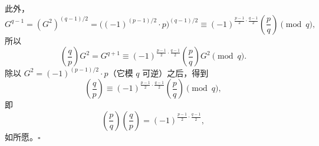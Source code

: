 此外，
\[
G^{q-1}=(G^2)^{(q-1)/2}=\bigl((-1)^{(p-1)/2}\cdot p\bigr)^{(q-1)/2}\equiv (-1)^{\frac{p-1}{2}\cdot\frac{q-1}{2}}\left(\frac{p}{q}\right)\pmod q,
\]
所以
\[
\left(\frac{q}{p}\right)G^2=G^{q+1}\equiv (-1)^{\frac{p-1}{2}\cdot\frac{q-1}{2}}\left(\frac{p}{q}\right)G^2 \pmod q .
\]
除以 $G^2=(-1)^{(p-1)/2}\cdot p$（它模 $q$ 可逆）之后，得到
\[
\left(\frac{q}{p}\right)\equiv (-1)^{\frac{p-1}{2}\cdot\frac{q-1}{2}}\left(\frac{p}{q}\right)\pmod q,
\]
即
\[
\left(\frac{p}{q}\right)\left(\frac{q}{p}\right)=(-1)^{\frac{p-1}{2}\cdot\frac{q-1}{2}},
\]
如所愿。\hfill$\square$
